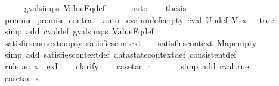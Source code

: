 \begin{isabellebody}
\ \ \ \ \isamarkupfalse%
\ gval{\isachardot}simps\ ValueEq{\isacharunderscore}def\isanewline
\ \ \ \ \isamarkupfalse%
\ auto\isanewline
\ \ \isamarkupfalse%
\ {\isacharquery}thesis\isanewline
\ \ \ \ \isamarkupfalse%
\ premise{}\ premise{}\ contra\ \isamarkupfalse%
\ auto\isanewline
{}\isamarkupfalse%
%
\endisatagproof
{\isafoldproof}%
%
\isadelimproof
\isanewline
%
\endisadelimproof
\isanewline
{}\isamarkupfalse%
\ cval{\isacharunderscore}undef{\isacharunderscore}empty{\isacharcolon}\ {\isachardoublequoteopen}cval\ Undef\ {\isacharparenleft}V\ x{\isacharparenright}\ {\isacharless}{\isachargreater}\ {\isacharequal}\ true{\isachardoublequoteclose}\isanewline
%
\isadelimproof
\ \ %
\endisadelimproof
%
\isatagproof
{}\isamarkupfalse%
\ {\isacharparenleft}simp\ add{\isacharcolon}\ cval{\isacharunderscore}def\ gval{\isachardot}simps\ ValueEq{\isacharunderscore}def{\isacharparenright}%
\endisatagproof
{\isafoldproof}%
%
\isadelimproof
\isanewline
%
\endisadelimproof
\isanewline
{}\isamarkupfalse%
\ satisfies{\isacharunderscore}context{\isacharunderscore}empty{\isacharcolon}\ {\isachardoublequoteopen}satisfies{\isacharunderscore}context\ {\isacharless}{\isachargreater}\ {\isasymlbrakk}{\isasymrbrakk}\ {\isasymand}\ satisfies{\isacharunderscore}context\ Map{\isachardot}empty\ {\isasymlbrakk}{\isasymrbrakk}{\isachardoublequoteclose}\isanewline
%
\isadelimproof
\ \ %
\endisadelimproof
%
\isatagproof
{}\isamarkupfalse%
\ {\isacharparenleft}simp\ add{\isacharcolon}\ satisfies{\isacharunderscore}context{\isacharunderscore}def\ datastate{}context{\isacharunderscore}def\ consistent{\isacharunderscore}def{\isacharparenright}\isanewline
\ \ \isamarkupfalse%
\ {\isacharparenleft}rule{\isacharunderscore}tac\ x{\isacharequal}{\isachardoublequoteopen}{\isacharless}{\isachargreater}{\isachardoublequoteclose}\ \ exI{\isacharparenright}\isanewline
\ \ \isamarkupfalse%
\ clarify\isanewline
\ \ \isamarkupfalse%
\ {\isacharparenleft}case{\isacharunderscore}tac\ r{\isacharparenright}\isanewline
\ \ \ \ \ \isamarkupfalse%
\ {\isacharparenleft}simp\ add{\isacharcolon}\ cval{\isacharunderscore}true{\isacharparenright}\isanewline
\ \ \ \ \isamarkupfalse%
\ {\isacharparenleft}case{\isacharunderscore}tac\ x{}{\isacharparenright}\isanewline
\ \ \ \ \ \isamarkupfalse%

\end{isabellebody}
